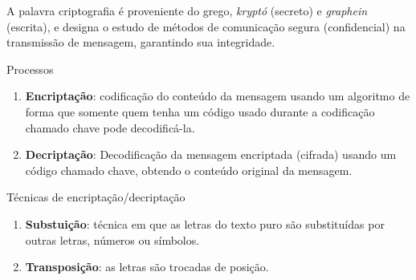 
\def\biblioref{

  "Criptografia e Segurança de Redes: Princípios e Práticas".  William
  Stallings. Editora Pearson, 4$^a$ edição, 2008.

}



\lecturetitle{\insertlecture}{\course}

\frame{\maketitle}


\begin{frame}{\insertlecture}
 A palavra \alert{criptografia} é proveniente do grego, {\it kryptó}
   (secreto) e {\it graphein} (escrita), e designa o estudo de métodos
   de comunicação segura (confidencial) na transmissão de mensagem,
   garantindo sua integridade.
\end{frame}

\begin{frame}{Processos}

\begin{enumerate}

\item {\bf Encriptação}: codificação do conteúdo da mensagem usando um
algoritmo de forma que somente quem tenha um código usado durante a
codificação chamado chave pode decodificá-la.

\item {\bf Decriptação}: Decodificação da mensagem encriptada (cifrada)
usando um código chamado chave, obtendo o conteúdo original da
mensagem.

\end{enumerate}

\end{frame}


\begin{frame}{Técnicas de encriptação/decriptação}

\begin{enumerate}
\item {\bf Substuição}: técnica em que as letras do texto puro são substituídas por outras 
letras, números ou símbolos.

\item {\bf Transposição}: as letras são trocadas de posição. 
\end{enumerate}

\end{frame}

